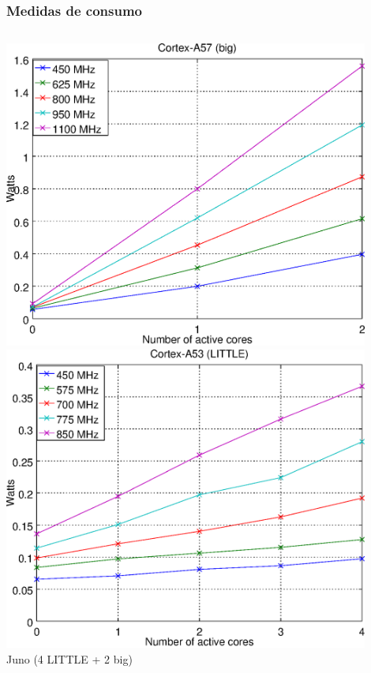 \documentclass[10pt]{beamer}
\begin{document}
\begin{frame}
  \frametitle{Medidas de consumo}
  \begin{columns}
    \begin{column}{0.4\textwidth}
      \begin{center}
        \includegraphics[width=0.9\textwidth]{Plots/modelo_consumo/juno_big.eps}\\\vspace{0.2cm}
        \includegraphics[width=0.9\textwidth]{Plots/modelo_consumo/juno_little.eps}\\
      {\centering \footnotesize {\sc Juno} (4 LITTLE + 2 big)}
      \end{center}
      

\end{column}
\end{columns}
\end{frame}
\end{document}
